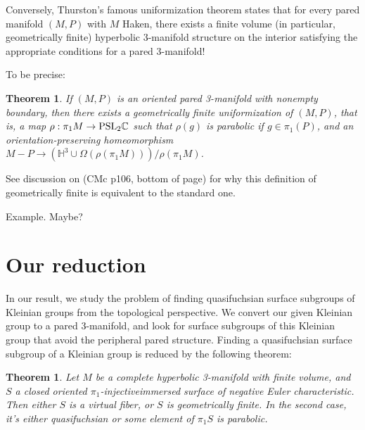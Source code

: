 \documentclass[12pt]{amsart}
\newtheorem{thm}[theorem]{Theorem}
\theoremstyle{definition}
\newcommand{\Om}{\Omega}
\newcommand{\PSL}{\mbox{\rm{PSL}}}
\newcommand{\piinj}{$\pi_1$-injective}
\begin{document}
Conversely, Thurston's famous uniformization theorem states that for every
pared manifold $(M,P)$ with $M$ Haken, there exists a finite volume (in
particular, geometrically finite) hyperbolic 3-manifold structure on the
interior satisfying the appropriate conditions for a pared 3-manifold!


To be precise:


\begin{thm}

If $(M,P)$ is an oriented pared 3-manifold with nonempty boundary, then
there exists a geometrically finite uniformization of $(M,P)$, that is, a map
$\rho: \pi_1M \to \PSL_2\mathbb{C}$ such that $\rho(g)$ is parabolic if $g \in
\pi_1(P)$, and an
orientation-preserving homeomorphism $M-P \to \left(\mathbb{H}^3
\cup \Om(\rho(\pi_1M))\right)/\rho(\pi_1M)$.

\end{thm}

See discussion on (CMc p106, bottom of page) for why this definition of
geometrically finite is equivalent to the standard one.

Example. Maybe? %

\section{Our reduction}

In our result, we study the problem of finding quasifuchsian surface subgroups
of Kleinian groups from the topological perspective. We convert our given
Kleinian group to a pared 3-manifold, and look for surface subgroups of this
Kleinian group that avoid the peripheral pared structure. Finding
a quasifuchsian surface subgroup of a Kleinian group is reduced by the
following theorem:

\begin{thm}

Let $M$ be a complete hyperbolic 3-manifold with finite volume, and $S$
a closed oriented \piinj immersed surface of negative Euler
characteristic. Then either $S$ is a virtual fiber, or $S$ is geometrically
finite. In the second case, it's either quasifuchsian or some element of
$\pi_1S$ is parabolic.

\end{thm}
\end{document}
